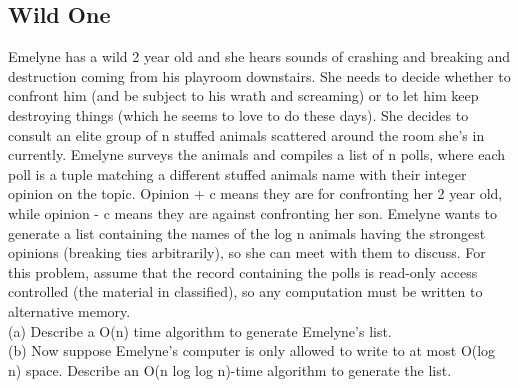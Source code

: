 \documentclass[12pt]{amsart}
\begin{document}
\subsection{Wild One} 
Emelyne has a wild 2 year old and she hears sounds of crashing and breaking and destruction coming from his playroom downstairs. She needs to decide whether to confront him (and be subject to his wrath and screaming) or to let him keep destroying things (which he seems to love to do these days). She decides to consult an elite group of n stuffed animals scattered around the room she's in currently. Emelyne surveys the animals and compiles a list of n polls, where each poll is a tuple matching a
different stuffed animals name with their integer opinion on the topic. Opinion + c means they are for
confronting her 2 year old, while opinion - c means they are against confronting her son. Emelyne wants to generate a list containing the names of the log n animals having the strongest opinions (breaking ties arbitrarily), so she can meet with them to discuss. For this problem, assume that the record containing the polls is read-only access controlled (the material in classified), so any computation must be written to alternative memory. 
\\

(a) Describe a O(n) time algorithm to generate Emelyne's list. 
\\

(b) Now suppose Emelyne's computer is only allowed to write to at most O(log n) space.
Describe an O(n log log n)-time algorithm to generate the list.
\end{document}

